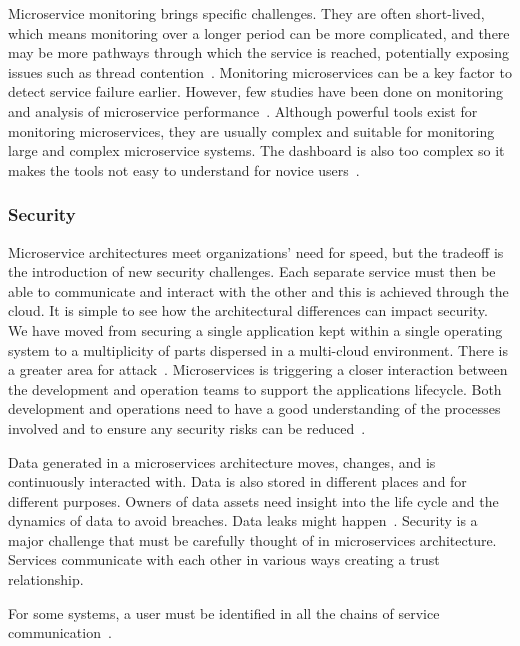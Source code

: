 \par Microservice monitoring brings specific challenges. They are often short-lived, which means monitoring over a longer period can be more complicated, and there may be more pathways through which the service is reached, potentially exposing issues such as thread contention~\cite{Zhang2019}. Monitoring microservices can be a key factor to detect service failure earlier. However, few studies have been done on monitoring and analysis of microservice performance~\cite{Saman2017, Monterio2018}. Although powerful tools exist for monitoring microservices, they are usually complex and suitable for monitoring large and complex microservice systems. 
The dashboard is also too complex so it makes the tools not easy to understand for novice users~\cite{Utomo2020}. 

\subsubsection{Security}%

Microservice architectures meet organizations' need for speed, but the tradeoff is the introduction of new security challenges. Each separate service must then be able to communicate and interact with the other and this is achieved through the cloud. It is simple to see how the architectural differences can impact security. We have moved from securing a single application kept within a single operating system to a multiplicity of parts dispersed in a multi-cloud environment. There is a greater area for attack~\cite{Zaytev2018}. Microservices is triggering a closer interaction between the development and operation teams to support the applications lifecycle. Both development and operations need to have a good understanding of the processes involved and to ensure any security risks can be reduced~\cite{Aaron2018,Amazon,Gonchar2017}. 

\par Data generated in a microservices architecture moves, changes, and is continuously interacted with. Data is also stored in different places and for different purposes. Owners of data assets need insight into the life cycle and the dynamics of data to avoid breaches. Data leaks might happen~\cite{tenev2019}. Security is a major challenge that must be carefully thought of in microservices architecture. Services communicate with each other in various ways creating a trust relationship. 

\par For some systems, a user must be identified in all the chains of service communication~\cite{Monterio2018}.

